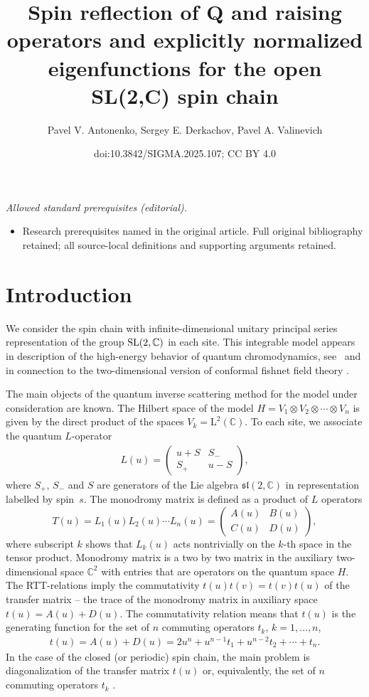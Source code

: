 \documentclass[10pt,a4paper]{amsart}
\title{Spin reflection of Q and raising operators and explicitly normalized eigenfunctions for the open SL(2,C) spin chain}
\author{Pavel V. Antonenko, Sergey E. Derkachov, Pavel A. Valinevich}
\date{doi:10.3842/SIGMA.2025.107; CC BY 4.0}
\numberwithin{equation}{section}
\begin{document}
\maketitle
\noindent\textit{Allowed standard prerequisites (editorial).}\begin{itemize}
\item Research prerequisites named in the original article. Full original bibliography retained; all source-local definitions and supporting arguments retained.
\end{itemize}\medskip
\section{Introduction}

We consider the spin chain with infinite-dimensional unitary principal series representation of the group ${\rm SL}(2,\mathbb{C})$ in each site.
This integrable model appears in description of the high-energy behavior of
quantum chromodynamics, see~\cite{FK, L0,L1,L2} and
in connection to the two-dimensional version \cite{DKO, KO} of conformal
fishnet field theory \cite{BCF,BD,BD1,CK,GGKK,GKK,GKKNS,KG}.

The main objects of the quantum inverse scattering method \cite{F,KSk,Skl91,FST,FaTa} for the model under consideration are known.
The Hilbert space of the model $H = V_1\otimes V_2\otimes\cdots\otimes V_n$ is given by the direct product of the spaces $V_k=\mathrm{L}^2(\mathbb{C})$.
To each site, we associate the quantum $L$-operator
\begin{align*}
L(u) =
\begin{pmatrix}
u + S & S_{-} \\
S_{+} & u - S \end{pmatrix} ,
\end{align*}
where $S_{+}$, $S_{-}$ and $S$ are generators of the Lie algebra $\mathfrak{sl}(2,\mathbb{C})$ in representation labelled by spin~$s$.
The monodromy matrix is defined as a product of $L$ operators
\begin{equation} \label{monodromy}
T(u)=L_1(u)L_2(u)\cdots L_n(u) = \begin{pmatrix}
A(u)& B(u)\\
C(u)& D(u)
\end{pmatrix},
\end{equation}
where subscript $k$ shows that $L_k(u)$ acts nontrivially on the $k$-th space in the tensor product.
Monodromy matrix is a two by two matrix in the auxiliary two-dimensional space
$\mathbb{C}^2$ with entries that are operators on the quantum space $H$.
 The RTT-relations \cite{F,KSk,Skl91,FST,FaTa} imply the commutativity
$t(u) t(v) = t(v) t(u)$ of the transfer matrix -- the trace of the
monodromy matrix in auxiliary space
$t(u) = A(u)+D(u)$.
The commutativity relation means that $t(u)$ is the generating function for the set of $n$ commuting operators $t_k$, $k=1,\dots,n$,
\begin{align*}
t(u) = A(u)+D(u) = 2u^n + u^{n-1} t_1 + u^{n-2} t_2
+ \cdots + t_n.
\end{align*}
In the case of the closed (or periodic) spin chain, the main problem is
diagonalization of the transfer matrix $t(u)$ or, equivalently, the set
of $n$ commuting operators $t_k$ \cite{F,KSk,Skl91,FST,FaTa}.
\end{document}
